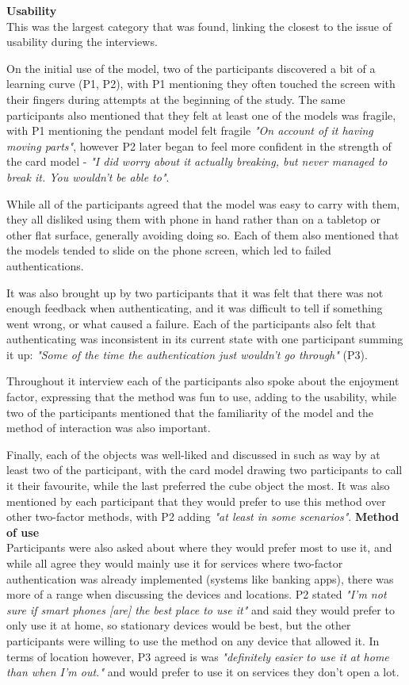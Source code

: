 \documentclass{l4proj}
\begin{document}
\textbf{Usability}\\
This was the largest category that was found, linking the closest to the issue of usability during the interviews.

On the initial use of the model, two of the participants discovered a bit of a learning curve (P1, P2), with P1 mentioning they often touched the screen with their fingers during attempts at the beginning of the study. The same participants also mentioned that they felt at least one of the models was fragile, with P1 mentioning the pendant model felt fragile \textit{"On account of it having moving parts"}, however P2 later began to feel more confident in the strength of the card model - \textit{"I did worry about it actually breaking, but never managed to break it. You wouldn't be able to"}.

While all of the participants agreed that the model was easy to carry with them, they all disliked using them with phone in hand rather than on a tabletop or other flat surface, generally avoiding doing so. Each of them also mentioned that the models tended to slide on the phone screen, which led to failed authentications.

It was also brought up by two participants that it was felt that there was not enough feedback when authenticating, and it was difficult to tell if something went wrong, or what caused a failure. Each of the participants also felt that authenticating was inconsistent in its current state with one participant summing it up: \textit{"Some of the time the authentication just wouldn't go through"} (P3).

Throughout it interview each of the participants also spoke about the enjoyment factor, expressing that the method was fun to use, adding to the usability, while two of the participants mentioned that the familiarity of the model and the method of interaction was also important.

Finally, each of the objects was well-liked and discussed in such as way by at least two of the participant, with the card model drawing two participants to call it their favourite, while the last preferred the cube object the most. It was also mentioned by each participant that they would prefer to use this method over other two-factor methods, with P2 adding \textit{"at least in some scenarios"}.
\newpage
\textbf{Method of use}\\
Participants were also asked about where they would prefer most to use it, and while all agree they would mainly use it for services where two-factor authentication was already implemented (systems like banking apps), there was more of a range when discussing the devices and locations. P2 stated \textit{"I'm not sure if smart phones [are] the best place to use it"} and said they would prefer to only use it at home, so stationary devices would be best, but the other participants were willing to use the method on any device that allowed it. In terms of location however, P3 agreed is was \textit{"definitely easier to use it at home than when I'm out."} and would prefer to use it on services they don't open a lot.
\end{document}
